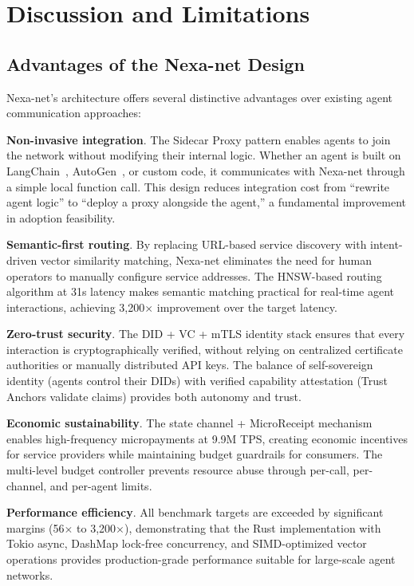\section{Discussion and Limitations}

\subsection{Advantages of the Nexa-net Design}

Nexa-net's architecture offers several distinctive advantages over existing agent communication approaches:

\textbf{Non-invasive integration}. The Sidecar Proxy pattern enables agents to join the network without modifying their internal logic. Whether an agent is built on LangChain~\cite{chase2022langchain}, AutoGen~\cite{wu2023autogen}, or custom code, it communicates with Nexa-net through a simple local function call. This design reduces integration cost from ``rewrite agent logic'' to ``deploy a proxy alongside the agent,'' a fundamental improvement in adoption feasibility.

\textbf{Semantic-first routing}. By replacing URL-based service discovery with intent-driven vector similarity matching, Nexa-net eliminates the need for human operators to manually configure service addresses. The HNSW-based routing algorithm at 31\textmu s latency makes semantic matching practical for real-time agent interactions, achieving 3,200$\times$ improvement over the target latency.

\textbf{Zero-trust security}. The DID + VC + mTLS identity stack ensures that every interaction is cryptographically verified, without relying on centralized certificate authorities or manually distributed API keys. The balance of self-sovereign identity (agents control their DIDs) with verified capability attestation (Trust Anchors validate claims) provides both autonomy and trust.

\textbf{Economic sustainability}. The state channel + MicroReceipt mechanism enables high-frequency micropayments at 9.9M TPS, creating economic incentives for service providers while maintaining budget guardrails for consumers. The multi-level budget controller prevents resource abuse through per-call, per-channel, and per-agent limits.

\textbf{Performance efficiency}. All benchmark targets are exceeded by significant margins (56$\times$ to 3,200$\times$), demonstrating that the Rust implementation with Tokio async, DashMap lock-free concurrency, and SIMD-optimized vector operations provides production-grade performance suitable for large-scale agent networks.

